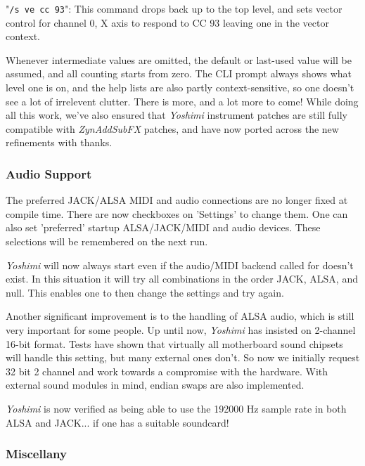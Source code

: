 \documentclass[
 11pt,
 twoside,
 a4paper,
 final                                 %
]{article}
\begin{document}
   "\texttt{/s ve cc 93}":
   This command drops back up to the top level, and sets vector control for
   channel 0, X axis to respond to CC 93 leaving one in the vector context.

   Whenever intermediate values are omitted, the default or last-used value
   will be assumed, and all counting starts from zero.  The CLI prompt always
   shows what level one is on, and the help lists are also partly
   context-sensitive, so one doesn't see a lot of irrelevent clutter.  There is
   more, and a lot more to come!  While doing all this work, we've also ensured
   that \textsl{Yoshimi} instrument patches are still fully compatible with
   \textsl{ZynAddSubFX} patches, and have now ported across the new refinements
   with thanks.

\subsubsection{Audio Support}
\label{subsubsec:new_features_audio_support}

   The preferred JACK/ALSA MIDI and audio connections are no longer fixed at
   compile time. There are now checkboxes on 'Settings' to change them.
   One can also set 'preferred' startup ALSA/JACK/MIDI and audio devices.
   These selections will be remembered on the next run.

   \textsl{Yoshimi} will now always start even if the audio/MIDI backend called
   for doesn't exist. In this situation it will try all combinations in the
   order JACK, ALSA, and null. This enables one to then change the settings
   and try again.

   Another significant improvement is to the handling of ALSA audio, which is
   still very important for some people. Up until now,
   \textsl{Yoshimi} has insisted on
   2-channel 16-bit format. Tests have shown that virtually all motherboard
   sound chipsets will handle this setting, but many external ones don't. So
   now we initially request 32 bit 2 channel and work towards a compromise with
   the hardware. With external sound modules in mind, endian swaps are also
   implemented.

   \textsl{Yoshimi} is now verified as being able to use the 192000 Hz sample
   rate in both ALSA and JACK... if one has a suitable soundcard!

\subsubsection{Miscellany}
\label{subsubsec:new_features_miscellany}
\end{document}
